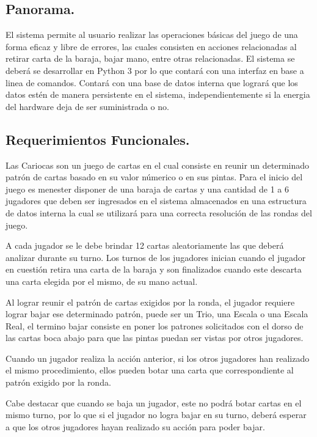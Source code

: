 \documentclass[60pt]{article}
\begin{document}
\subsection{Panorama.}\label{cap:panorama}
El sistema permite al usuario realizar las operaciones básicas del juego de una forma eficaz y libre de errores, las cuales consisten en acciones relacionadas al retirar carta de la baraja, bajar mano, entre otras relacionadas. El sistema se deberá se desarrollar en Python 3 por lo que contará con una interfaz en base a linea de comandos. Contará con una base de datos interna que logrará que los datos estén de manera persistente en el sistema, independientemente si la energia del hardware deja de ser suministrada o no.
\subsection{Requerimientos Funcionales.}\label{cap:requerimientos-funcionales}
Las Cariocas son un juego de cartas en el cual consiste en reunir un determinado patrón de cartas basado en su valor númerico o en sus pintas. Para el inicio del juego es menester disponer de una baraja de cartas y una cantidad de 1 a 6 jugadores que deben ser ingresados en el sistema almacenados en una estructura de datos interna la cual se utilizará para una correcta resolución de las rondas del juego. 

A cada jugador se le debe brindar 12 cartas aleatoriamente las que deberá analizar durante su turno. Los turnos de los jugadores inician cuando el jugador en cuestión retira una carta de la baraja y son finalizados cuando este descarta una carta elegida por el mismo, de su mano actual.

Al lograr reunir el patrón de cartas exigidos por la ronda, el jugador requiere lograr bajar ese determinado patrón, puede ser un Trio, una Escala o una Escala Real, el termino bajar consiste en poner los patrones solicitados con el dorso de las cartas boca abajo para que las pintas puedan ser vistas por otros jugadores.

Cuando un jugador realiza la acción anterior, si los otros jugadores han realizado el mismo procedimiento, ellos pueden botar una carta que correspondiente al patrón exigido por la ronda.

Cabe destacar que cuando se baja un jugador, este no podrá botar cartas en el mismo turno, por lo que si el jugador no logra bajar en su turno, deberá esperar a que los otros jugadores hayan realizado su acción para poder bajar.
\end{document}
